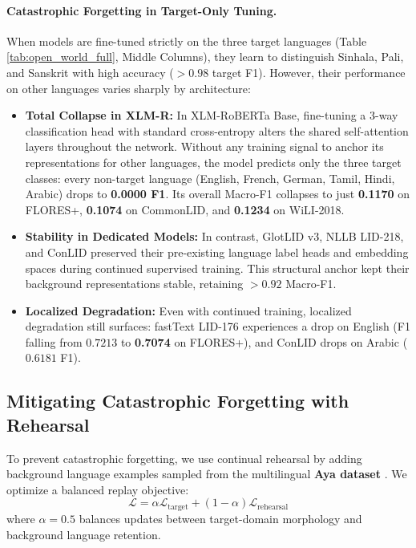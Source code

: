\documentclass[11pt]{article}
\begin{document}
\paragraph{Catastrophic Forgetting in Target-Only Tuning.}
When models are fine-tuned strictly on the three target languages (Table \ref{tab:open_world_full}, Middle Columns), they learn to distinguish Sinhala, Pali, and Sanskrit with high accuracy ($>0.98$ target F1). However, their performance on other languages varies sharply by architecture:
\begin{itemize}
    \item \textbf{Total Collapse in XLM-R:} In XLM-RoBERTa Base, fine-tuning a 3-way classification head with standard cross-entropy alters the shared self-attention layers throughout the network. Without any training signal to anchor its representations for other languages, the model predicts only the three target classes: every non-target language (English, French, German, Tamil, Hindi, Arabic) drops to \textbf{0.0000 F1}. Its overall Macro-F1 collapses to just \textbf{0.1170} on FLORES+, \textbf{0.1074} on CommonLID, and \textbf{0.1234} on WiLI-2018.
    \item \textbf{Stability in Dedicated Models:} In contrast, GlotLID v3, NLLB LID-218, and ConLID preserved their pre-existing language label heads and embedding spaces during continued supervised training. This structural anchor kept their background representations stable, retaining $>0.92$ Macro-F1.
    \item \textbf{Localized Degradation:} Even with continued training, localized degradation still surfaces: fastText LID-176 experiences a drop on English (F1 falling from $0.7213$ to \textbf{0.7074} on FLORES+), and ConLID drops on Arabic ($0.6181$ F1).
\end{itemize}

\subsection{Mitigating Catastrophic Forgetting with Rehearsal}
To prevent catastrophic forgetting, we use continual rehearsal by adding background language examples sampled from the multilingual \textbf{Aya dataset} \cite{ahmed2024aya}. We optimize a balanced replay objective:
\begin{equation}
\mathcal{L} = \alpha \mathcal{L}_{\text{target}} + (1 - \alpha) \mathcal{L}_{\text{rehearsal}}
\end{equation}
where $\alpha = 0.5$ balances updates between target-domain morphology and background language retention.
\end{document}
